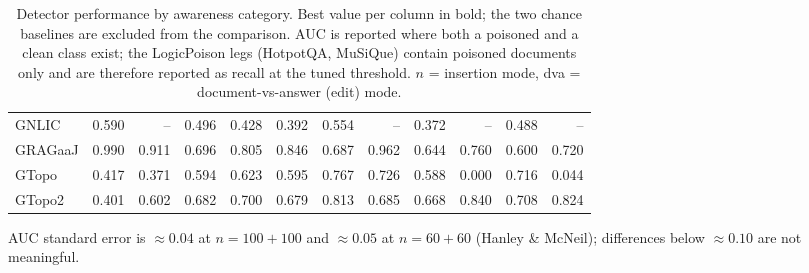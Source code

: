 \begin{table}[t]
\begin{tabular}{lrrrrrrrrrrr}
    GNLIC & 0.590 & -- & 0.496 & 0.428 & 0.392 & 0.554 & -- & 0.372 & -- & 0.488 & -- \\
    GRAGaaJ & 0.990 & 0.911 & 0.696 & 0.805 & 0.846 & 0.687 & 0.962 & 0.644 & 0.760 & 0.600 & 0.720 \\
    GTopo & 0.417 & 0.371 & 0.594 & 0.623 & 0.595 & 0.767 & 0.726 & 0.588 & 0.000 & 0.716 & 0.044 \\
    GTopo2 & 0.401 & 0.602 & 0.682 & 0.700 & 0.679 & 0.813 & 0.685 & 0.668 & 0.840 & 0.708 & 0.824 \\
    \bottomrule
  \end{tabular}
  \par\medskip\footnotesize AUC standard error is $\approx 0.04$ at $n=100+100$ and $\approx 0.05$ at $n=60+60$ (Hanley \& McNeil); differences below $\approx 0.10$ are not meaningful.
  \caption{Detector performance by awareness category. Best value per column in bold; the two chance baselines are excluded from the comparison. AUC is reported where both a poisoned and a clean class exist; the LogicPoison legs (HotpotQA, MuSiQue) contain poisoned documents only and are therefore reported as recall at the tuned threshold. $n$ = insertion mode, dva = document-vs-answer (edit) mode.}
  \label{tab:detector-categories}
\end{table}

